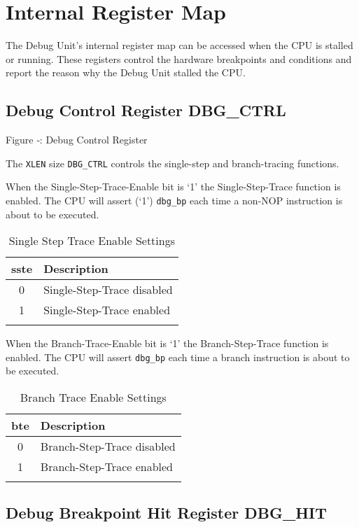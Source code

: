 \section{Internal Register Map}\label{internal-register-map}

The Debug Unit's internal register map can be accessed when the CPU is
stalled or running. These registers control the hardware breakpoints and
conditions and report the reason why the Debug Unit stalled the CPU.

\subsection{Debug Control Register
DBG\_CTRL}\label{debug-control-register-dbg_ctrl}

\missingfigure{}

Figure ‑: Debug Control Register

The \texttt{XLEN} size \texttt{DBG\_CTRL} controls the single-step and branch-tracing
functions.

When the Single-Step-Trace-Enable bit is `1' the Single-Step-Trace
function is enabled. The CPU will assert (`1') \texttt{dbg\_bp} each time a
non-NOP instruction is about to be executed.

\begin{longtable}[]{@{}cl@{}}
\toprule
\textbf{sste} & \textbf{Description}\tabularnewline
\midrule
\endhead
0 & Single-Step-Trace disabled\tabularnewline
1 & Single-Step-Trace enabled\tabularnewline
\bottomrule
\caption{Single Step Trace Enable Settings}
\label{tab:single-step-trace-settings}
\end{longtable}

When the Branch-Trace-Enable bit is `1' the Branch-Step-Trace function
is enabled. The CPU will assert \texttt{dbg\_bp} each time a branch instruction
is about to be executed.

\begin{longtable}[]{@{}cl@{}}
\toprule
\textbf{bte} & \textbf{Description}\tabularnewline
\midrule
\endhead
0 & Branch-Step-Trace disabled\tabularnewline
1 & Branch-Step-Trace enabled\tabularnewline
\bottomrule
\caption{Branch Trace Enable Settings}
\label{tab:branch-trace-settings}
\end{longtable}


\subsection{Debug Breakpoint Hit Register
DBG\_HIT}\label{debug-breakpoint-hit-register-dbg_hit}


